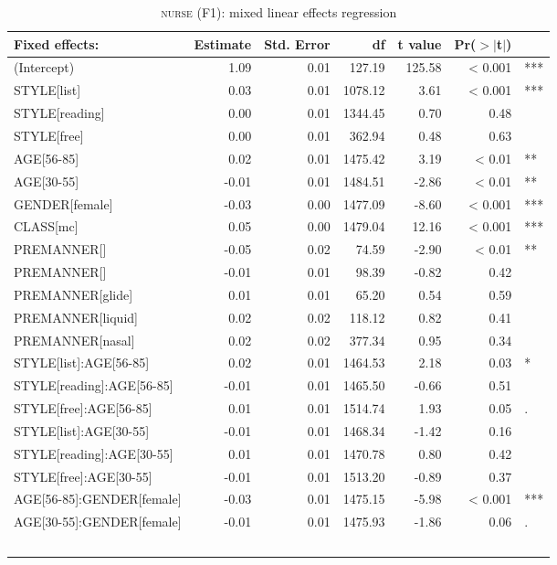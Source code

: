 {
	\footnotesize
	\begin{longtable}[c]{p{}rrrrrl}
		\caption{\textsc{nurse} (F1): mixed linear effects regression}\label{tab.regression.nurse.f1}\\
		
		\hline
		Fixed effects: & Estimate & Std. Error & df & t value & Pr($>$$|$t$|$) & \\ 
		\hline
		(Intercept) & 1.09 & 0.01 & 127.19 & 125.58 & < 0.001 & *** \\ 
		STYLE[list] & 0.03 & 0.01 & 1078.12 & 3.61 & < 0.001 & *** \\ 
		STYLE[reading] & 0.00 & 0.01 & 1344.45 & 0.70 & 0.48 & \\ 
		STYLE[free] & 0.00 & 0.01 & 362.94 & 0.48 & 0.63 & \\ 
		AGE[56-85] & 0.02 & 0.01 & 1475.42 & 3.19 & < 0.01 & ** \\ 
		AGE[30-55] & -0.01 & 0.01 & 1484.51 & -2.86 & < 0.01 & ** \\ 
		GENDER[female] & -0.03 & 0.00 & 1477.09 & -8.60 & < 0.001 & *** \\ 
		CLASS[mc] & 0.05 & 0.00 & 1479.04 & 12.16 & < 0.001 & *** \\ 
		PREMANNER[\isi{affricate}] & -0.05 & 0.02 & 74.59 & -2.90 & < 0.01 & ** \\ 
		PREMANNER[\isi{fricative}] & -0.01 & 0.01 & 98.39 & -0.82 & 0.42 & \\ 
		PREMANNER[glide] & 0.01 & 0.01 & 65.20 & 0.54 & 0.59 & \\ 
		PREMANNER[liquid] & 0.02 & 0.02 & 118.12 & 0.82 & 0.41 & \\ 
		PREMANNER[nasal] & 0.02 & 0.02 & 377.34 & 0.95 & 0.34 & \\ 
		STYLE[list]:AGE[56-85] & 0.02 & 0.01 & 1464.53 & 2.18 & 0.03 & * \\ 
		STYLE[reading]:AGE[56-85] & -0.01 & 0.01 & 1465.50 & -0.66 & 0.51 & \\ 
		STYLE[free]:AGE[56-85] & 0.01 & 0.01 & 1514.74 & 1.93 & 0.05 & .\\ 
		STYLE[list]:AGE[30-55] & -0.01 & 0.01 & 1468.34 & -1.42 & 0.16 & \\ 
		STYLE[reading]:AGE[30-55] & 0.01 & 0.01 & 1470.78 & 0.80 & 0.42 & \\ 
		STYLE[free]:AGE[30-55] & -0.01 & 0.01 & 1513.20 & -0.89 & 0.37 & \\ 
		AGE[56-85]:GENDER[female] & -0.03 & 0.01 & 1475.15 & -5.98 & < 0.001 & *** \\ 
		AGE[30-55]:GENDER[female] & -0.01 & 0.01 & 1475.93 & -1.86 & 0.06 & .\\ 
$$
\end{longtable}}
